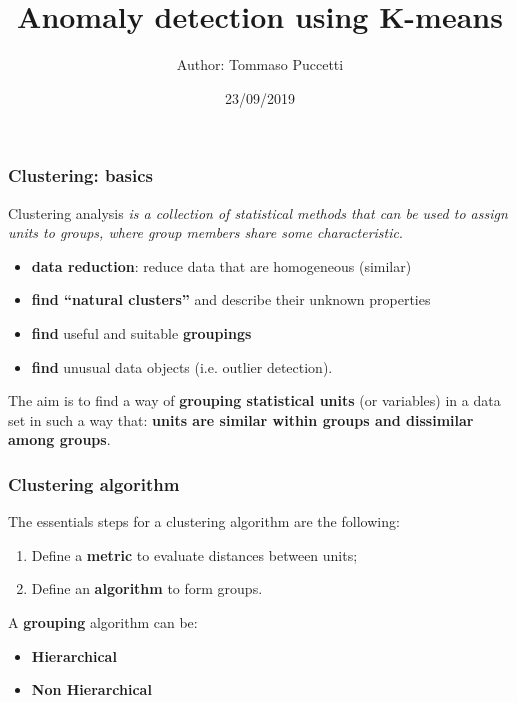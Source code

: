 \documentclass[xcolor ={table,usenames,dvipsnames}]{beamer}
\title{Anomaly detection using K-means}
\author{Author: Tommaso Puccetti}
\institute{Universit\`a  degli Studi di Firenze}
\date{23/09/2019}
\theoremstyle{definition}
\begin{document}
	
	\begin{frame}
		\maketitle
	\end{frame}

	\begin{frame}
		\frametitle{Clustering: basics}
			Clustering analysis \textit{is a collection of statistical methods that can be used to assign units
				to groups, where group members share some characteristic}.  
			
			\begin{itemize}
				\item \textbf{data reduction}: reduce data that are homogeneous (similar)
				\item \textbf{find “natural clusters”} and describe their unknown properties
				\item \textbf{find} useful and suitable \textbf{groupings}
				\item \textbf{find} unusual data objects (i.e. outlier detection).
			\end{itemize}
		
			The aim is to find a way of \textbf{grouping statistical units} (or variables) in a data
			set in such a way that:
			\textbf{units are similar within groups and dissimilar among groups}.
	\end{frame}

	\begin{frame}
		\frametitle{Clustering algorithm}
			The essentials steps for a clustering algorithm are the following:
			
			\begin{enumerate}
				\item Define a \textbf{metric} to evaluate distances between units;
				\item Define an \textbf{algorithm} to form groups. \\
			\end{enumerate}
			
			A \textbf{grouping} algorithm can be:
			\begin{itemize}
				\item \textbf{Hierarchical}
				\item \textbf{Non Hierarchical}
			\end{itemize}	
	\end{frame}
\end{document}
